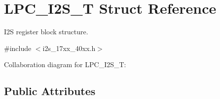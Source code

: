 \hypertarget{structLPC__I2S__T}{}\section{L\+P\+C\+\_\+\+I2\+S\+\_\+T Struct Reference}
\label{structLPC__I2S__T}


I2S register block structure.  




{\ttfamily \#include $<$i2s\+\_\+17xx\+\_\+40xx.\+h$>$}



Collaboration diagram for L\+P\+C\+\_\+\+I2\+S\+\_\+T\+:
\subsection*{Public Attributes}
